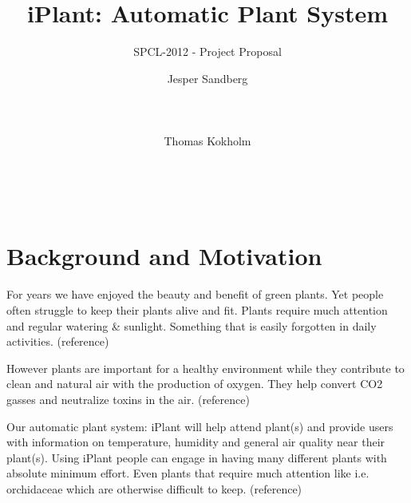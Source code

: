 \documentclass{ubicomp2012}
\begin{document}
\setlength{\paperheight}{11in}
\setlength{\paperwidth}{8.5in}
\setlength{\pdfpageheight}{\paperheight}
\setlength{\pdfpagewidth}{\paperwidth}




\title{iPlant: Automatic Plant System}
\subtitle{SPCL-2012 - Project Proposal}
\author{
  \alignauthor Jesper Sandberg\\
    \\
    \\
    \\
 \alignauthor Thomas Kokholm\\
    \\
    \\
    \\
      }
\maketitle

\section{Background and Motivation}
For years we have enjoyed the beauty and benefit of green plants. Yet people often struggle to keep their plants alive and fit. Plants require much attention and regular watering \& sunlight. Something that is easily forgotten in daily activities. (reference)

However plants are important for a healthy environment while they contribute to clean and natural air with the production of oxygen.
They help convert CO2 gasses and neutralize toxins in the air. (reference)

Our automatic plant system: iPlant will help attend plant(s) and provide users with information on temperature, humidity and general air quality near their plant(s). Using iPlant people can engage in having many different plants with absolute minimum effort. Even plants that require much attention like i.e. orchidaceae which are otherwise difficult to keep. (reference)
\end{document}
